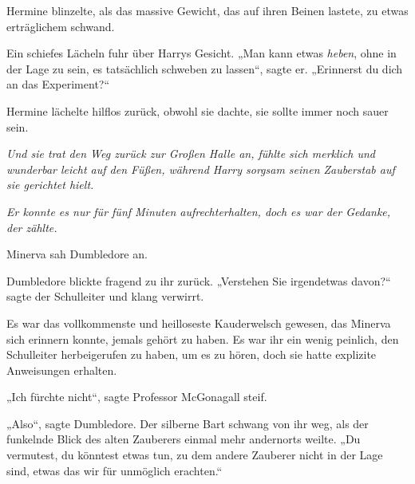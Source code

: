Hermine blinzelte, als das massive Gewicht, das auf ihren Beinen lastete, zu etwas erträglichem schwand.

Ein schiefes Lächeln fuhr über Harrys Gesicht. „Man kann etwas \emph{heben}, ohne in der Lage zu sein, es tatsächlich schweben zu lassen“, sagte er. „Erinnerst du dich an das Experiment?“

Hermine lächelte hilflos zurück, obwohl sie dachte, sie sollte immer noch sauer sein.

\emph{Und sie trat den Weg zurück zur Großen Halle an, fühlte sich merklich und wunderbar leicht auf den Füßen, während Harry sorgsam seinen Zauberstab auf sie gerichtet hielt.}

\emph{Er konnte es nur für fünf Minuten aufrechterhalten, doch es war der Gedanke, der zählte.}

\later

Minerva sah Dumbledore an.

Dumbledore blickte fragend zu ihr zurück. „Verstehen Sie irgendetwas davon?“ sagte der Schulleiter und klang verwirrt.

Es war das vollkommenste und heilloseste Kauderwelsch gewesen, das Minerva sich erinnern konnte, jemals gehört zu haben. Es war ihr ein wenig peinlich, den Schulleiter herbeigerufen zu haben, um es zu hören, doch sie hatte explizite Anweisungen erhalten.

„Ich fürchte nicht“, sagte Professor McGonagall steif.

„Also“, sagte Dumbledore. Der silberne Bart schwang von ihr weg, als der funkelnde Blick des alten Zauberers einmal mehr andernorts weilte. „Du vermutest, du könntest etwas tun, zu dem andere Zauberer nicht in der Lage sind, etwas das wir für unmöglich erachten.“

